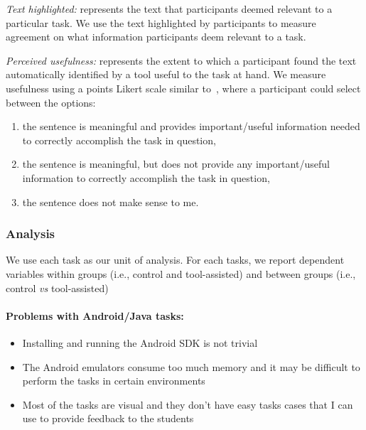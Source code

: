 \textit{Text highlighted:} represents the text that participants deemed relevant to a particular task. We use the text highlighted by participants to measure agreement on what information participants deem relevant to a task.



\textit{Perceived usefulness:} represents the extent to which a participant found the text automatically identified by a tool useful to the task at hand. We measure usefulness using a  points Likert scale similar to~\cite{nadi2020}, where a participant could select between the options:


\begin{enumerate}[label=\textit{\alph*.}]
\item the sentence is meaningful
and provides important/useful information needed to
correctly accomplish the task in question,
\item the
sentence is meaningful, but does not provide any important/useful information to correctly accomplish the task in question,
\item the sentence does not make sense to me.
\end{enumerate}




\subsubsection{Analysis}


We use each task as our unit of analysis. For each tasks, we report dependent variables within groups (i.e., control and tool-assisted) and between groups (i.e., control \textit{vs} tool-assisted)



\clearpage



\smallskip
\paragraph{\textbf{Problems with Android/Java tasks:}}

\begin{itemize}
    \item Installing and running the Android SDK is not trivial
    \item The Android emulators consume too much memory and it may be difficult to perform the tasks in certain environments
    \item Most of the tasks are visual and they don't have easy tasks cases that I can use to provide feedback to the students
\end{itemize}



